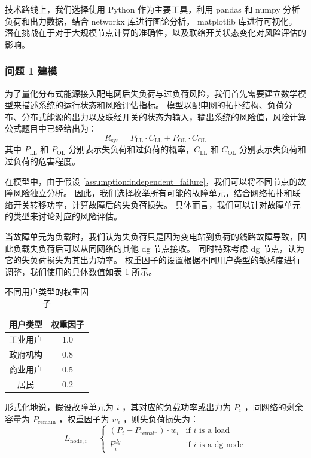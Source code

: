 \documentclass{article}
\begin{document}
技术路线上，我们选择使用 Python 作为主要工具，利用 pandas 和 numpy 分析负荷和出力数据，结合 networkx 库进行图论分析， matplotlib 库进行可视化。
潜在挑战在于对于大规模节点计算的准确性，以及联络开关状态变化对风险评估的影响。

\subsubsection{问题 1 建模}\label{subsubsec:problem1_model}

为了量化分布式能源接入配电网后失负荷与过负荷风险，我们首先需要建立数学模型来描述系统的运行状态和风险评估指标。
模型以配电网的拓扑结构、负荷分布、分布式能源的出力以及联经开关的状态为输入，输出系统的风险值，风险计算公式题目中已经给出为：
\begin{equation}\label{eq:risk_formula}
  R_{\text{sys}} = P_{\text{LL}} \cdot C_{\text{LL}} + P_{\text{OL}} \cdot C_{\text{OL}}
\end{equation}
其中 $P_{\text{LL}}$ 和 $P_{\text{OL}}$ 分别表示失负荷和过负荷的概率，$C_{\text{LL}}$ 和 $C_{\text{OL}}$ 分别表示失负荷和过负荷的危害程度。

在模型中，由于假设 \ref{assumption:independent_failure}，我们可以将不同节点的故障风险独立分析。
因此，我们选择枚举所有可能的故障单元，结合网络拓扑和联络开关转移功率，计算故障后的失负荷损失。
具体而言，我们可以针对故障单元的类型来讨论对应的风险评估。

当故障单元为负载时，我们认为失负荷只是因为变电站到负荷的线路故障导致，因此负载失负荷后可以从同网络的其他 dg 节点接收。
同时特殊考虑 dg 节点，认为它的失负荷损失为其出力功率。
权重因子的设置根据不同用户类型的敏感度进行调整，我们使用的具体数值如表 \ref{tab:weight_factor} 所示。
\begin{table}[h]
  \centering
  \begin{tabular}{|c|c|}
    \hline
    用户类型 & 权重因子 \\
    \hline
    工业用户 & 1.0 \\
    政府机构 & 0.8 \\
    商业用户 & 0.5 \\
    居民 & 0.2 \\
    \hline
  \end{tabular}
  \caption{不同用户类型的权重因子}
  \label{tab:weight_factor}
\end{table}
形式化地说，假设故障单元为 $i$ ，其对应的负载功率或出力为 $P_i$ ，同网络的剩余容量为 $P_{\text{remain}}$ ，权重因子为 $w_i$ ，则失负荷损失为：
\begin{equation}\label{eq:loss_node}
  L_{\text{node},i} =
  \begin{cases}
    (P_i - P_{\text{remain}}) \cdot w_i & \text{if } i \text{ is a load} \\
    P_i^{dg} & \text{if } i \text{ is a dg node}
  \end{cases}
\end{equation}
\end{document}
